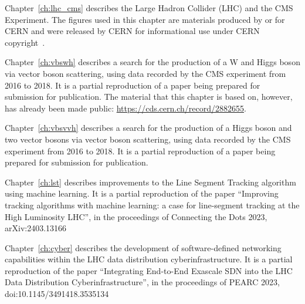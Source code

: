\begin{acknowledgements}
Chapter~\ref{ch:lhc_cms} describes the Large Hadron Collider (LHC) and the CMS Experiment. 
The figures used in this chapter are materials produced by or for CERN and were released by CERN for informational use under CERN copyright~\cite{CERNCopyright}. 

Chapter~\ref{ch:vbswh} describes a search for the production of a W and Higgs boson via vector boson scattering, using data recorded by the CMS experiment from 2016 to 2018. 
It is a partial reproduction of a paper being prepared for submission for publication. 
The material that this chapter is based on, however, has already been made public: \url{https://cds.cern.ch/record/2882655}.

Chapter~\ref{ch:vbsvvh} describes a search for the production of a Higgs boson and two vector bosons via vector boson scattering, using data recorded by the CMS experiment from 2016 to 2018. 
It is a partial reproduction of a paper being prepared for submission for publication. 

Chapter~\ref{ch:lst} describes improvements to the Line Segment Tracking algorithm using machine learning. 
It is a partial reproduction of the paper ``Improving tracking algorithms with machine learning: a case for line-segment tracking at the High Luminosity LHC'', in the proceedings of Connecting the Dots 2023, arXiv:2403.13166

Chapter~\ref{ch:cyber} describes the development of software-defined networking capabilities within the LHC data distribution cyberinfrastructure. 
It is a partial reproduction of the paper ``Integrating End-to-End Exascale SDN into the LHC Data Distribution Cyberinfrastructure'', in the proceedings of PEARC 2023, doi:10.1145/3491418.3535134

\end{acknowledgements}
